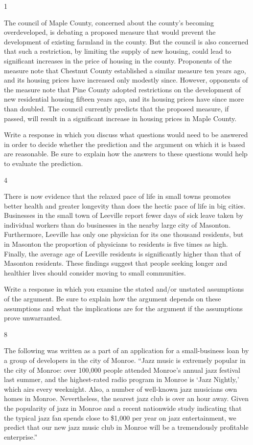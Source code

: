 \documentclass[]{article}
\begin{document}
1

The council of Maple County, concerned about the county's becoming
overdeveloped, is debating a proposed measure that would prevent the
development of existing farmland in the county. But the council is also
concerned that such a restriction, by limiting the supply of new
housing, could lead to significant increases in the price of housing in
the county. Proponents of the measure note that Chestnut County
established a similar measure ten years ago, and its housing prices have
increased only modestly since. However, opponents of the measure note
that Pine County adopted restrictions on the development of new
residential housing fifteen years ago, and its housing prices have since
more than doubled. The council currently predicts that the proposed
measure, if passed, will result in a significant increase in housing
prices in Maple County.

Write a response in which you discuss what questions would need to be
answered in order to decide whether the prediction and the argument on
which it is based are reasonable. Be sure to explain how the answers to
these questions would help to evaluate the prediction.

4

There is now evidence that the relaxed pace of life in small towns
promotes better health and greater longevity than does the hectic pace
of life in big cities. Businesses in the small town of Leeville report
fewer days of sick leave taken by individual workers than do businesses
in the nearby large city of Masonton. Furthermore, Leeville has only one
physician for its one thousand residents, but in Masonton the proportion
of physicians to residents is five times as high. Finally, the average
age of Leeville residents is significantly higher than that of Masonton
residents. These findings suggest that people seeking longer and
healthier lives should consider moving to small communities.

Write a response in which you examine the stated and/or unstated
assumptions of the argument. Be sure to explain how the argument depends
on these assumptions and what the implications are for the argument if
the assumptions prove unwarranted.

8

The following was written as a part of an application for a
small-business loan by a group of developers in the city of Monroe.
``Jazz music is extremely popular in the city of Monroe: over 100,000
people attended Monroe's annual jazz festival last summer, and the
highest-rated radio program in Monroe is `Jazz Nightly,' which airs
every weeknight. Also, a number of well-known jazz musicians own homes
in Monroe. Nevertheless, the nearest jazz club is over an hour away.
Given the popularity of jazz in Monroe and a recent nationwide study
indicating that the typical jazz fan spends close to \$1,000 per year on
jazz entertainment, we predict that our new jazz music club in Monroe
will be a tremendously profitable enterprise.''
\end{document}
